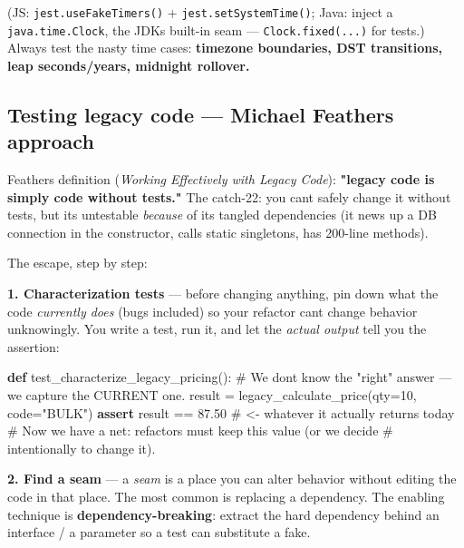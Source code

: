 \documentclass[11pt]{article}
\newenvironment{Shaded}{\begin{snugshade}}{\end{snugshade}}
\newcommand{\CommentTok}[1]{\textcolor[rgb]{0.48,0.49,0.49}{#1}}
\newcommand{\ControlFlowTok}[1]{\textcolor[rgb]{0.99,0.74,0.29}{\textbf{#1}}}
\newcommand{\DecValTok}[1]{\textcolor[rgb]{0.96,0.45,0.00}{#1}}
\newcommand{\FloatTok}[1]{\textcolor[rgb]{0.96,0.45,0.00}{#1}}
\newcommand{\KeywordTok}[1]{\textcolor[rgb]{0.81,0.81,0.76}{\textbf{#1}}}
\newcommand{\NormalTok}[1]{\textcolor[rgb]{0.81,0.81,0.76}{#1}}
\newcommand{\OperatorTok}[1]{\textcolor[rgb]{0.81,0.81,0.76}{#1}}
\newcommand{\StringTok}[1]{\textcolor[rgb]{0.96,0.31,0.31}{#1}}
\begin{document}
(JS: \texttt{jest.useFakeTimers()} + \texttt{jest.setSystemTime()}; Java: inject a \texttt{java.time.Clock}, the JDK\textquotesingle s built-in seam --- \texttt{Clock.fixed(...)} for tests.) Always test the nasty time cases: \textbf{timezone boundaries, DST transitions, leap seconds/years, midnight rollover.}

\subsection{Testing legacy code --- Michael Feathers\textquotesingle{} approach}\label{testing-legacy-code--michael-feathers-approach}

Feathers\textquotesingle{} definition (\emph{Working Effectively with Legacy Code}): \textbf{"legacy code is simply code without tests."} The catch-22: you can\textquotesingle t safely change it without tests, but it\textquotesingle s untestable \emph{because} of its tangled dependencies (it news up a DB connection in the constructor, calls static singletons, has 200-line methods).

The escape, step by step:

\textbf{1. Characterization tests} --- before changing anything, pin down what the code \emph{currently does} (bugs included) so your refactor can\textquotesingle t change behavior unknowingly. You write a test, run it, and let the \emph{actual output} tell you the assertion:


\begin{Shaded}
\begin{Highlighting}[]
\KeywordTok{def}\NormalTok{ test\_characterize\_legacy\_pricing():}
    \CommentTok{\# We don\textquotesingle{}t know the "right" answer — we capture the CURRENT one.}
\NormalTok{    result }\OperatorTok{=}\NormalTok{ legacy\_calculate\_price(qty}\OperatorTok{=}\DecValTok{10}\NormalTok{, code}\OperatorTok{=}\StringTok{"BULK"}\NormalTok{)}
    \ControlFlowTok{assert}\NormalTok{ result }\OperatorTok{==} \FloatTok{87.50}   \CommentTok{\# \textless{}{-} whatever it actually returns today}
    \CommentTok{\# Now we have a net: refactors must keep this value (or we decide}
    \CommentTok{\# intentionally to change it).}
\end{Highlighting}
\end{Shaded}

\textbf{2. Find a seam} --- a \emph{seam} is a place you can alter behavior without editing the code in that place. The most common is replacing a dependency. The enabling technique is \textbf{dependency-breaking}: extract the hard dependency behind an interface / a parameter so a test can substitute a fake.
\end{document}
